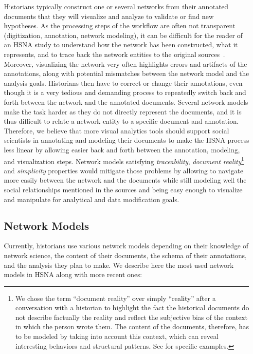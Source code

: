 Historians typically construct one or several networks from their annotated documents that they will visualize and analyze to validate or find new hypotheses.
As the processing steps of the workflow are often not transparent (digitization, annotation, network modeling), it can be difficult for the reader of an HSNA study to understand how the network has been constructed, what it represents, and to trace back the network entities to the original sources~\cite{dufournaudCommentRendreVisible2018}.
Moreover, visualizing the network very often highlights errors and artifacts of the annotations, along with potential mismatches between the network model and the analysis goals.
Historians then have to correct or change their annotations, even though it is a very tedious and demanding process to repeatedly switch back and forth between the network and the annotated documents.
Several network models make the task harder as they do not directly represent the documents, and it is thus difficult to relate a network entity to a specific document and annotation.
Therefore, we believe that more visual analytics tools should support social scientists in annotating and modeling their documents to make the HSNA process less linear by allowing easier back and forth between the annotation, modeling, and visualization steps.
Network models satisfying  \emph{traceability}, \emph{document reality}\footnote{We chose the term ``document reality'' over simply ``reality'' after a conversation with a historian to highlight the fact the historical documents do not describe factually the reality and reflect the subjective bias of the context in which the person wrote them\cite{karila-cohenNouvellesCuisinesHistoire2018}. The content of the documents, therefore, has to be modeled by taking into account this context, which can reveal interesting behaviors and structural patterns. See \cite{lemercierBackSourcesPracticing2021} for specific examples.} and \emph{simplicity} properties would mitigate those problems by allowing to navigate more easily between the network and the documents while still modeling well the social relationships mentioned in the sources and being easy enough to visualize and manipulate for analytical and data modification goals.

\subsection{Network Models}

Currently, historians use various network models depending on their knowledge of network science, the content of their documents, the schema of their annotations, and the analysis they plan to make.
We describe here the most used network models in HSNA along with more recent ones:


